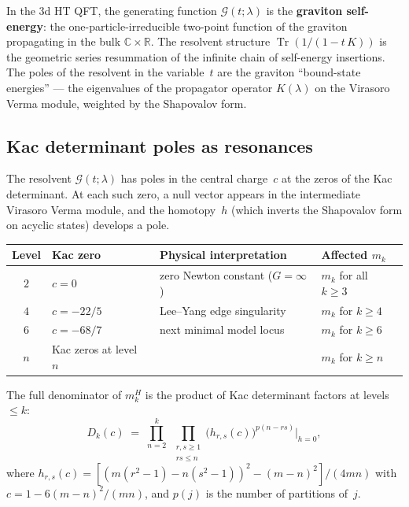 \documentclass[11pt]{article}
\newcommand{\C}{\mathbb{C}}
\newcommand{\R}{\mathbb{R}}
\newcommand{\Tr}{\operatorname{Tr}}
\begin{document}
\begin{observation}\label{obs:self-energy-wn}
In the 3d HT QFT, the generating function $\mathcal{G}(t; \lambda)$
is the \textbf{graviton self-energy}: the one-particle-irreducible
two-point function of the graviton propagating in the bulk
$\C \times \R$.  The resolvent structure
$\Tr(1/(1 - t\,K))$ is the geometric series resummation of the
infinite chain of self-energy insertions.  The poles of the
resolvent in the variable~$t$ are the graviton ``bound-state
energies'' --- the eigenvalues of the propagator operator
$K(\lambda)$ on the Virasoro Verma module, weighted by the
Shapovalov form.
\end{observation}

\subsection*{Kac determinant poles as resonances}

The resolvent $\mathcal{G}(t; \lambda)$ has poles in the central
charge~$c$ at the zeros of the Kac determinant.  At each
such zero, a null vector appears in the intermediate Virasoro
Verma module, and the homotopy~$h$ (which inverts the Shapovalov
form on acyclic states) develops a pole.

\begin{center}
\small
\renewcommand{\arraystretch}{1.15}
\begin{tabular}{@{}clll@{}}
Level & Kac zero & Physical interpretation
  & Affected $m_k$ \\
\hline
$2$ & $c = 0$ & zero Newton constant ($G = \infty$)
  & $m_k$ for all $k \ge 3$ \\
$4$ & $c = -22/5$ & Lee--Yang edge singularity
  & $m_k$ for $k \ge 4$ \\
$6$ & $c = -68/7$ & next minimal model locus
  & $m_k$ for $k \ge 6$ \\
$n$ & Kac zeros at level~$n$ & & $m_k$ for $k \ge n$
\end{tabular}
\end{center}

\noindent
The full denominator of $m_k^H$ is the product of Kac
determinant factors at levels $\le k$:
\begin{equation}\label{eq:mk-denominator-wn}
D_k(c) \;=\;
\prod_{n=2}^{k}\;
\prod_{\substack{r,s \ge 1 \\ rs \le n}}
\bigl(h_{r,s}(c)\bigr)^{p(n - rs)}\bigg|_{h=0},
\end{equation}
where $h_{r,s}(c) = [(m(r^2-1) - n(s^2-1))^2 - (m-n)^2]/(4mn)$
with $c = 1 - 6(m-n)^2/(mn)$, and $p(j)$ is the
number of partitions of~$j$.
\end{document}

